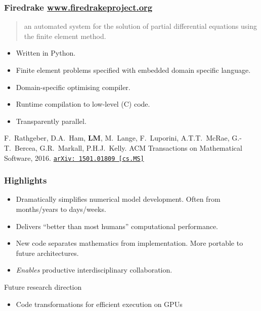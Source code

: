 \documentclass[presentation]{beamer}
\newcommand{\arxivlink}[2]{%
  \href{http://www.arxiv.org/abs/#1}%
  {\texttt{arXiv:\,#1\,[#2]}}%
}
\begin{document}
\begin{frame}
  \frametitle{Firedrake \url{www.firedrakeproject.org}}
  \begin{quote}
    {\normalfont [\ldots]} an automated system for the solution of
    partial differential equations using the finite element method.
  \end{quote}
  \begin{itemize}
  \item Written in Python.
  \item Finite element problems specified with embedded domain
    specific language.
  \item Domain-specific optimising compiler.
  \item Runtime compilation to low-level (C) code.
  \item Transparently parallel.
  \end{itemize}
  \begin{flushright}
    {\scriptsize F.~Rathgeber, D.A.~Ham, \textbf{LM}, M.~Lange,
      F.~Luporini, A.T.T.~McRae, G.-T.~Bercea, G.R.~Markall,
      P.H.J.~Kelly. ACM Transactions on Mathematical Software,
      2016. \arxivlink{1501.01809}{cs.MS}}
  \end{flushright}
\end{frame}
\begin{frame}
  \frametitle{Highlights}
  \begin{itemize}
  \item Dramatically simplifies numerical model development.  Often
    from months/years to days/weeks.
  \item Delivers ``better than most humans'' computational
    performance.
  \item New code separates mathematics from implementation.  More
    portable to future architectures.
  \item \emph{Enables} productive interdisciplinary collaboration.
  \end{itemize}

  \begin{block}{Future research direction}
    \begin{itemize}
    \item Code transformations for efficient execution on GPUs
    \end{itemize}
  \end{block}
\end{frame}
\end{document}

